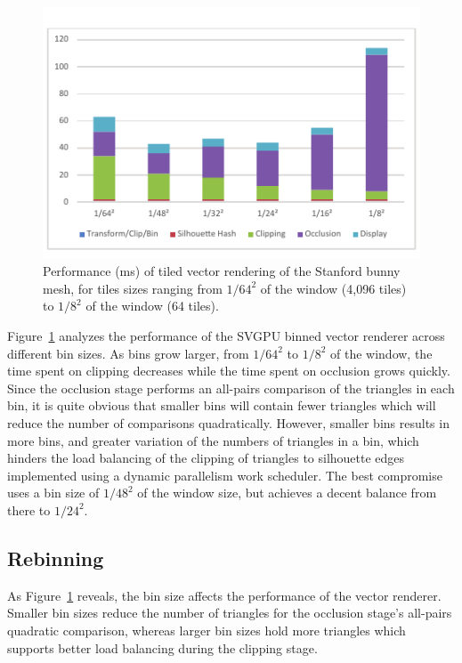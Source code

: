 \documentclass[review]{acmsiggraph}
\begin{document}
\begin{figure} \centering
\includegraphics[width=\columnwidth]{images/binperf.pdf}
\caption{Performance (ms) of tiled vector rendering of the Stanford bunny mesh,
for tiles sizes ranging from $1/64^2$ of the window (4,096 tiles) to $1/8^2$ of
the window (64 tiles).}
\label{fig:binperf}
\end{figure}

Figure~\ref{fig:binperf} analyzes the performance of the SVGPU binned vector
renderer across different bin sizes. As bins grow larger, from $1/64^2$ to
$1/8^2$ of the window, the time spent on clipping decreases while the time
spent on occlusion grows quickly. Since the occlusion stage performs an
all-pairs comparison of the triangles in each bin, it is quite obvious that
smaller bins will contain fewer triangles which will reduce the number of
comparisons quadratically. However, smaller bins results in more bins, and
greater variation of the numbers of triangles in a bin, which hinders the load
balancing of the clipping of triangles to silhouette edges implemented using a
dynamic parallelism work scheduler. The best compromise uses a bin size of
$1/48^2$ of the window size, but achieves a decent balance from there to
$1/24^2.$

\subsection{Rebinning}
As Figure~\ref{fig:binperf} reveals, the bin size affects the performance of
the vector renderer. Smaller bin sizes reduce the number of triangles for the
occlusion stage's all-pairs quadratic comparison, whereas larger bin sizes
hold more triangles which supports better load balancing during the clipping
stage.
\end{document}
